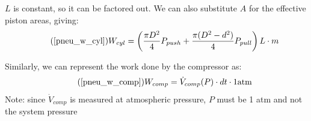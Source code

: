 \documentclass[11pt,a4paper,titlepage]{article}
\begin{document}
	$L$ is constant, so it can be factored out. We can also substitute $A$ for the effective piston areas, giving:
	\begin{equation} \tag{\ref*{pneu_w_cyl}}
		W_{cyl} = \left( \frac{\pi D^2}{4} P_{push} + \frac{\pi (D^2 - d^2)}{4} P_{pull} \right) L \cdot m
	\end{equation}
	
	Similarly, we can represent the work done by the compressor as:
	\begin{equation} \tag{\ref*{pneu_w_comp}}
		W_{comp} = \dot{V}_{comp}(P) \cdot dt \cdot 1 \text{atm}
	\end{equation}
	Note: since $\dot{V}_{comp}$ is measured at atmospheric pressure, $P$ must be 1 atm and not the system pressure
	
\end{document}
